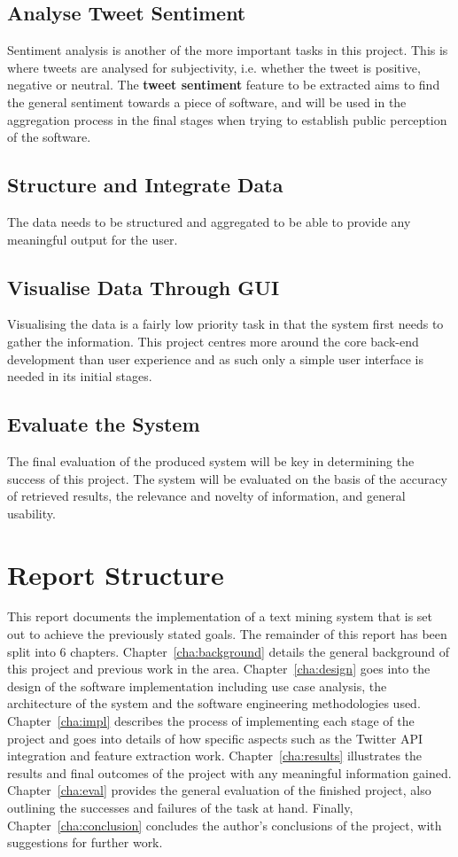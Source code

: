 \subsection{Analyse Tweet Sentiment}
Sentiment analysis is another of the more important tasks in this project. This is where tweets are analysed for subjectivity, i.e. whether the tweet is positive, negative or neutral. The \textbf{tweet sentiment} feature to be extracted aims to find the general sentiment towards a piece of software, and will be used in the aggregation process in the final stages when trying to establish public perception of the software.

\subsection{Structure and Integrate Data}
The data needs to be structured and aggregated to be able to provide any meaningful output for the user.

\subsection{Visualise Data Through GUI}
Visualising the data is a fairly low priority task in that the system first needs to gather the information. This project centres more around the core back-end development than user experience and as such only a simple user interface is needed in its initial stages.

\subsection{Evaluate the System}
The final evaluation of the produced system will be key in determining the success of this project. The system will be evaluated on the basis of the accuracy of retrieved results, the relevance and novelty of information, and general usability.

\section{Report Structure}
This report documents the implementation of a text mining system that is set out to achieve the previously stated goals. The remainder of this report has been split into 6 chapters.
Chapter~\ref{cha:background} details the general background of this project and previous work in the area.
Chapter~\ref{cha:design} goes into the design of the software implementation including use case analysis, the architecture of the system and the software engineering methodologies used.
Chapter~\ref{cha:impl} describes the process of implementing each stage of the project and goes into details of how specific aspects such as the Twitter API integration and feature extraction work.
Chapter~\ref{cha:results} illustrates the results and final outcomes of the project with any meaningful information gained.
Chapter~\ref{cha:eval} provides the general evaluation of the finished project, also outlining the successes and failures of the task at hand.
Finally, Chapter~\ref{cha:conclusion} concludes the author's conclusions of the project, with suggestions for further work.
